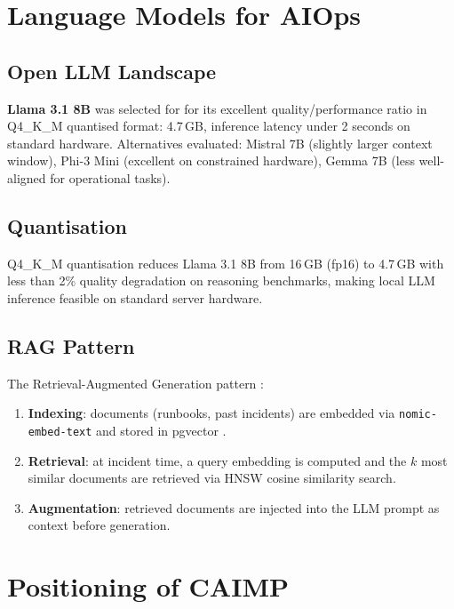 \section{Language Models for AIOps}

\subsection{Open LLM Landscape}

\textbf{Llama 3.1 8B} \cite{llama3_meta2024} was selected for \caimp{} for its
excellent quality/performance ratio in Q4\_K\_M quantised format: 4.7\,GB,
inference latency under 2 seconds on standard hardware. Alternatives evaluated:
Mistral 7B (slightly larger context window), Phi-3 Mini (excellent on constrained
hardware), Gemma 7B (less well-aligned for operational tasks).

\subsection{Quantisation}

Q4\_K\_M quantisation \cite{dettmers2022quantization} reduces Llama 3.1 8B from
16\,GB (fp16) to 4.7\,GB with less than 2\% quality degradation on reasoning
benchmarks, making local LLM inference feasible on standard server hardware.

\subsection{RAG Pattern}

The Retrieval-Augmented Generation pattern \cite{lewis2020rag}:
\begin{enumerate}
  \item \textbf{Indexing}: documents (runbooks, past incidents) are embedded via
    \texttt{nomic-embed-text} and stored in pgvector \cite{pgvector2021}.
  \item \textbf{Retrieval}: at incident time, a query embedding is computed and
    the $k$ most similar documents are retrieved via HNSW cosine similarity search.
  \item \textbf{Augmentation}: retrieved documents are injected into the LLM
    prompt as context before generation.
\end{enumerate}

\section{Positioning of CAIMP}


